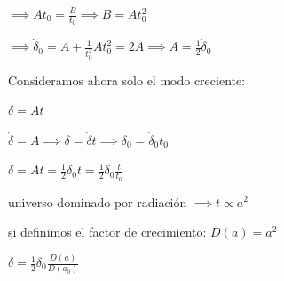 \documentclass[12pt]{book}
\begin{document}
$\implies A t_0 = \frac{B}{t_0} \implies B = A t_0^2$

$\implies \dot\delta_0 = A + \frac{1}{t_0^2} A t_0^2 = 2 A \implies A = \frac{1}{2} \dot\delta_0$

Consideramos ahora solo el modo creciente:

$\delta = A t$

$\dot \delta = A \implies \delta = \dot\delta t \implies \delta_0 = \dot\delta_0 t_0$

$\delta = A t= \frac{1}{2} \dot\delta_0 t= \frac{1}{2}\delta_0 \frac{t}{t_0}$

universo dominado por radiación $\implies t \propto a^2$

si definimos el factor de crecimiento: $D(a) = a^2$
 
$\delta = \frac{1}{2} \delta_{0} \frac{D(a)}{D(a_{0})} $ 
\end{document}

